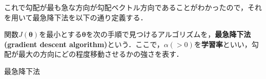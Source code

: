これで勾配が最も急な方向が勾配ベクトル方向であることがわかったので，それを用いて最急降下法を以下の通り定義する．
\begin{defi}[最急降下法]
関数$J({\bm \theta})$を最小とする${\bm \theta}$を次の手順で見つけるアルゴリズムを，{\bf 最急降下法(gradient descent algorithm)}という．ここで，$\alpha (>0)$を{\bf 学習率}といい，勾配が最大の方向にどの程度移動させるかの強さを表す．
\begin{algorithm}[H]
\caption{最急降下法}
\begin{algorithmic}[1]

\EndWhile
\end{algorithmic}
\end{algorithm}
\end{defi}

